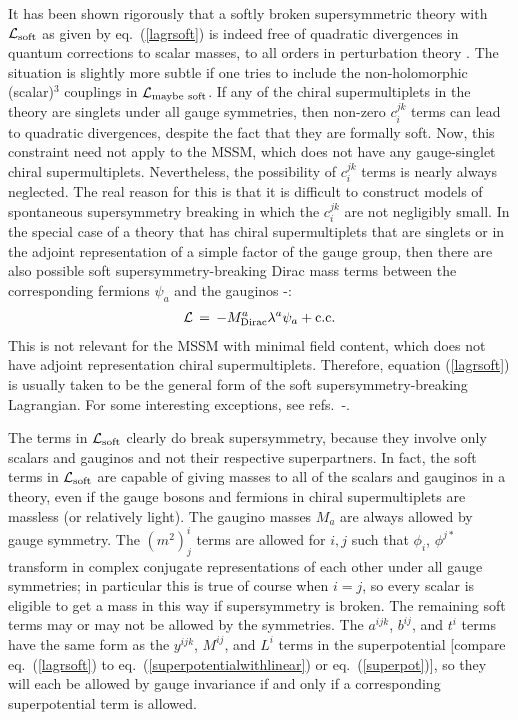 \documentclass[12pt]{article}
\def\beq{\begin{eqnarray}}
\def\eeq{\end{eqnarray}}
\def\lagr{{\cal L}}
\begin{document}
It has been shown rigorously that a softly broken supersymmetric theory
with $\lagr_{\rm soft}$ as given by eq.~(\ref{lagrsoft}) is indeed free of
quadratic divergences in quantum corrections to scalar masses, to all
orders in perturbation theory \cite{softterms}. The situation is slightly
more subtle if one tries to include the non-holomorphic (scalar)$^3$
couplings in $\lagr_{{\rm maybe}\>\,{\rm soft}}$. If any of the chiral
supermultiplets in the theory are singlets under all gauge symmetries,
then non-zero $c_i^{jk}$ terms can lead to quadratic divergences, despite
the fact that they are formally soft. Now, this constraint need not apply
to the MSSM, which does not have any gauge-singlet chiral supermultiplets.
Nevertheless, the possibility of $c_i^{jk}$ terms is nearly always
neglected. The real reason for this is that it is difficult to
construct models of spontaneous supersymmetry breaking in which the
$c_i^{jk}$ are not negligibly small.  
In the special case of a theory that has 
chiral supermultiplets that are singlets or 
in the adjoint representation of a simple factor of the gauge group,
then there are also possible soft supersymmetry-breaking Dirac mass
terms between the corresponding fermions $\psi_a$ and the gauginos
\cite{Polchinski:1982an}-\cite{Fox:2002bu}:
\beq
{\cal L} \,=\,  -M_{\rm Dirac}^a \lambda^a \psi_a + {\rm c.c.}
\label{eq:Diracgauginos}
\eeq
This is not relevant for the MSSM with minimal field 
content, which does not have adjoint representation chiral 
supermultiplets. Therefore, equation (\ref{lagrsoft}) is usually taken to 
be the general form of the soft supersymmetry-breaking Lagrangian. For 
some interesting exceptions, see 
refs.~\cite{Polchinski:1982an}-\cite{Plehn:2008ae}.

The terms in $\lagr_{\rm soft}$ clearly do break supersymmetry, 
because they involve
only scalars and gauginos and not their respective superpartners. In fact,
the soft terms in $\lagr_{\rm soft}$ are capable of giving masses to all
of the scalars and gauginos in a theory, even if the gauge bosons and
fermions in chiral supermultiplets are massless (or relatively light). The
gaugino masses $M_a$ are always allowed by gauge symmetry. The $(m^2)_j^i$
terms are allowed for $i,j$ such that $\phi_i$, $\phi^{j*}$ transform in
complex conjugate representations of each other under all gauge
symmetries; in particular this is true of course when $i=j$, so every
scalar is eligible to get a mass in this way if supersymmetry is broken. 
The remaining soft terms may or may not be allowed by the symmetries. 
The $a^{ijk}$, $b^{ij}$, and $t^i$ 
terms have the same form as the $y^{ijk}$, $M^{ij}$, and $L^i$ terms in 
the superpotential [compare eq.~(\ref{lagrsoft}) to 
eq.~(\ref{superpotentialwithlinear})
or eq.~(\ref{superpot})], so they will each be allowed by gauge 
invariance if and only if a corresponding superpotential term is allowed. 
\end{document}
